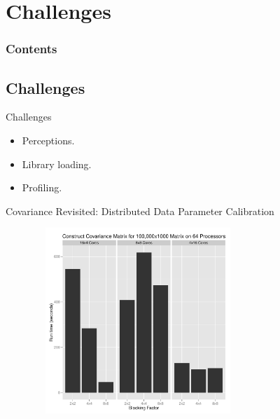 \section{Challenges}

\hidenum
\begin{frame}[noframenumbering]
\frametitle{Contents}
\end{frame}
\shownum


\subsection{Challenges}

\begin{frame}
  \begin{block}{Challenges}
    \begin{itemize}[<+-|alert@+>]
      \item Perceptions.
      \item Library loading.
      \item Profiling.
    \end{itemize}
  \end{block}
\end{frame}


\begin{frame}
  \begin{block}{Covariance Revisited: Distributed Data Parameter Calibration}
    \begin{center}
     \includegraphics[width=10cm, height=7cm]{pics/cov_param}
    \end{center}
  \end{block}
\end{frame}

